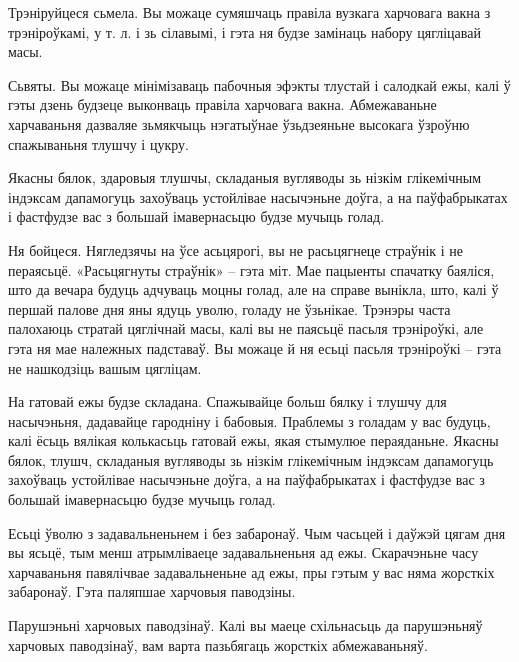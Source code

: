 Трэніруйцеся сьмела.
Вы можаце сумяшчаць правіла вузкага харчовага вакна з трэніроўкамі, у т. л. і зь сілавымі, і гэта ня будзе замінаць набору цягліцавай масы.

Сьвяты.
Вы можаце мінімізаваць пабочныя эфэкты тлустай і салодкай ежы, калі ў гэты дзень будзеце выконваць правіла харчовага вакна. Абмежаваньне харчаваньня дазваляе зьмякчыць нэгатыўнае ўзьдзеяньне высокага ўзроўню спажываньня тлушчу і цукру.

Якасны бялок, здаровыя тлушчы, складаныя вугляводы зь нізкім глікемічным індэксам дапамогуць захоўваць устойлівае насычэньне доўга, а на паўфабрыкатах і фастфудзе вас з большай імавернасьцю будзе мучыць голад.

Ня бойцеся.
Нягледзячы на ўсе асьцярогі, вы не расьцягнеце страўнік і не пераясьцё. «Расьцягнуты страўнік» – гэта міт. Мае пацыенты спачатку баяліся, што да вечара будуць адчуваць моцны голад, але на справе вынікла, што, калі ў першай палове дня яны ядуць уволю, голаду не ўзьнікае. Трэнэры часта палохаюць стратай цяглічнай масы, калі вы не паясьцё пасьля трэніроўкі, але гэта ня мае належных падставаў. Вы можаце й ня есьці пасьля трэніроўкі – гэта не нашкодзіць вашым цягліцам.

На гатовай ежы будзе складана.
Спажывайце больш бялку і тлушчу для насычэньня, дадавайце гародніну і бабовыя. Праблемы з голадам у вас будуць, калі ёсьць вялікая колькасьць гатовай ежы, якая стымулюе пераяданьне. Якасны бялок, тлушч, складаныя вугляводы зь нізкім глікемічным індэксам дапамогуць захоўваць устойлівае насычэньне доўга, а на паўфабрыкатах і фастфудзе вас з большай імавернасьцю будзе мучыць голад.

Есьці ўволю з задавальненьнем і без забаронаў.
Чым часьцей і даўжэй цягам дня вы ясьцё, тым менш атрымліваеце задавальненьня ад ежы. Скарачэньне часу харчаваньня павялічвае задавальненьне ад ежы, пры гэтым у вас няма жорсткіх забаронаў. Гэта паляпшае харчовыя паводзіны.

Парушэньні харчовых паводзінаў.
Калі вы маеце схільнасьць да парушэньняў харчовых паводзінаў, вам варта пазьбягаць жорсткіх абмежаваньняў.
